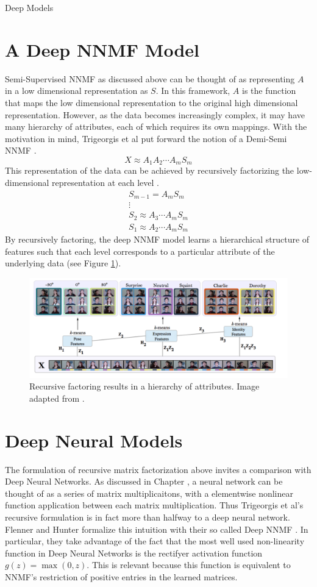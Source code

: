 \documentclass[12pt]{pom_thesis}
\begin{document}
\begin{chapter}{Deep Models}
\section{A Deep NNMF Model}
Semi-Supervised NNMF as discussed above can be thought of as representing $A$ in a low dimensional representation as $S$. In this framework, $A$ is the function that maps the low dimensional representation to the original high dimensional representation. However, as the data becomes increasingly complex, it may have many hierarchy of attributes, each of which requires its own mappings. With the motivation in mind, Trigeorgis et al put forward the notion of a Demi-Semi NNMF \cite{trigeorgis2014deep}.
$$X \approx A_1A_2 \cdots A_m S_m$$
This representation of the data can be achieved by recursively factorizing the low-dimensional representation at each level \cite{trigeorgis2014deep}.
\begin{align*}
S_{m-1} = A_mS_m\\
\vdots \\
S_2  \approx A_3 \cdots A_m  S_m\\
S_1  \approx A_2 \cdots A_m  S_m
\end{align*}
By recursively factoring, the deep NNMF model learns a hierarchical structure of features such that each level corresponds to a particular attribute of the underlying data (see Figure \ref{deepNNMF}). 
\begin{figure}
	\label{deepNNMF}
	\centering
	\includegraphics[width=7in]{deep}
	\caption{Recursive factoring results in a hierarchy of attributes. Image adapted from  \cite{trigeorgis2014deep}.}
\end{figure}
\section{Deep Neural Models}
	The formulation of recursive matrix factorization above invites a comparison with Deep Neural Networks. As discussed in Chapter \label{NN}, a neural network can be thought of as a series of matrix multiplicaitons, with a elementwise nonlinear function application between each matrix multiplication. Thus Trigeorgis et al's recursive formulation is in fact more than halfway to a deep neural network. Flenner and Hunter formalize this intuition with their so called Deep NNMF \cite{deepNonNeg}. In particular, they take advantage of the fact that the most well used non-linearity function in Deep Neural Networks is the rectifyer activation function $g(z)=\max(0,z)$. This is relevant because this function is equivalent to NNMF's restriction of positive entries in the learned matrices.  
	\end{chapter}
\end{document}
